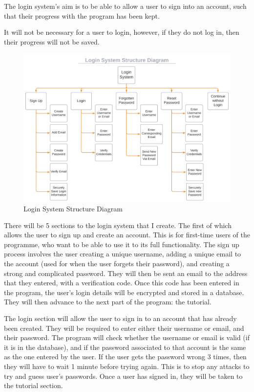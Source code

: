 \documentclass[12pt]{article}
\begin{document}
The login system's aim is to be able to allow a user to sign into an account, such that their progress with the program has been kept.

It will not be necessary for a user to login, however, if they do not log in, then their progress will not be saved.

\begin{figure}[h]
    \centering
    \captionsetup{justification=centering}
    \includegraphics[scale=0.45]{login-system-structure-diagram}
    \caption{Login System Structure Diagram}
\end{figure}

There will be 5 sections to the login system that I create. The first of which allows the user to sign up and create an account. This is for first-time users of the programme, who want to be able to use it to its full functionality. The sign up process involves the user creating a unique username, adding a unique email to the account (used for when the user forgets their password), and creating a strong and complicated password. They will then be sent an email to the address that they entered, with a verification code. Once this code has been entered in the program, the user's login details will be encrypted and stored in a database. They will then advance to the next part of the program: the tutorial.

The login section will allow the user to sign in to an account that has already been created. They will be required to enter either their username or email, and their password. The program will check whether the username or email is valid (if it is in the database), and if the password associated to that account is the same as the one entered by the user. If the user gets the password wrong 3 times, then they will have to wait 1 minute before trying again. This is to stop any attacks to try and guess user's passwords. Once a user has signed in, they will be taken to the tutorial section.
\end{document}
